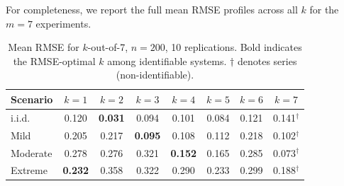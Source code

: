 \documentclass[12pt]{article}
\theoremstyle{definition}
\theoremstyle{remark}
\begin{document}
For completeness, we report the full mean RMSE profiles across all
$k$ for the $m = 7$ experiments.

\begin{table}[htbp]
  \centering
  \caption{Mean RMSE for $k$-out-of-7, $n = 200$, 10 replications.
    Bold indicates the RMSE-optimal $k$ among identifiable systems.
    $\dagger$ denotes series (non-identifiable).}
  \label{tab:m7profiles}
  \begin{tabular}{lccccccc}
    \toprule
    Scenario & $k=1$ & $k=2$ & $k=3$ & $k=4$ & $k=5$ & $k=6$ & $k=7$ \\
    \midrule
    i.i.d.    & 0.120 & \textbf{0.031} & 0.094 & 0.101 & 0.084 & 0.121 & 0.141$^\dagger$ \\
    Mild      & 0.205 & 0.217 & \textbf{0.095} & 0.108 & 0.112 & 0.218 & 0.102$^\dagger$ \\
    Moderate  & 0.278 & 0.276 & 0.321 & \textbf{0.152} & 0.165 & 0.285 & 0.073$^\dagger$ \\
    Extreme   & \textbf{0.232} & 0.358 & 0.322 & 0.290 & 0.233 & 0.299 & 0.188$^\dagger$ \\
    \bottomrule
  \end{tabular}
\end{table}
\end{document}

